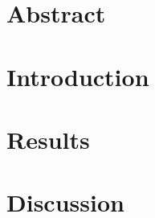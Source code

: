 \section{Abstract} 

\lipsum[1]


\section{Introduction}

\lipsum[2]

\section{Results}

\lipsum[3]


\section{Discussion}

\lipsum[4]